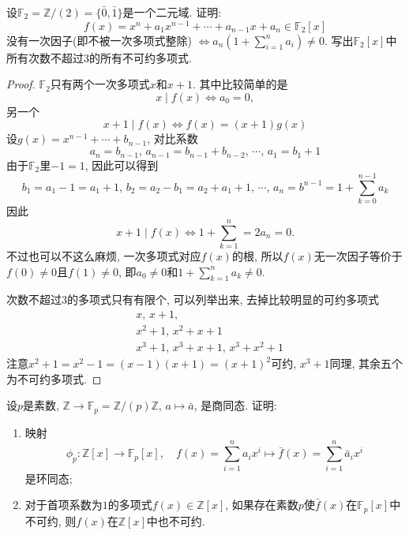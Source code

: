 \begin{problem}
    设$\mathbb{F}_2 = \mathbb{Z}/(2) = \{\bar{0}, \bar{1}\}$是一个二元域. 证明:
    \[
        f(x) = x^n + a_1x^{n - 1} + \cdots + a_{n - 1}x + a_n \in \mathbb{F}_2[x]
    \]
    没有一次因子(即不被一次多项式整除)
    \(
        \Leftrightarrow a_n\left(1 + \sum_{i = 1}^n a_i\right) \neq 0.
    \)
    写出$\mathbb{F}_2[x]$中所有次数不超过$3$的所有不可约多项式.
\end{problem}

\begin{proof}
    $\mathbb{F}_2$只有两个一次多项式$x$和$x + 1$. 其中比较简单的是
    \[
        x \mid f(x) \iff a_0 = 0,
    \]
    另一个
    \[
        x + 1 \mid f(x) \iff f(x) = (x + 1)g(x)
    \]
    设$g(x) = x^{n - 1} + \cdots + b_{n - 1}$, 对比系数
    \[
        a_n = b_{n - 1},\, a_{n - 1} = b_{n - 1} + b_{n - 2},\, \cdots,\, a_{1} = b_1 + 1
    \]
    由于$\mathbb{F}_2$里$-1 = 1$, 因此可以得到
    \[
        b_1 = a_1 - 1 = a_1 + 1,\, b_2 = a_2 - b_1 = a_2 + a_1 + 1,\, \cdots,\, a_n = b^{n - 1} = 1 + \sum_{k = 0}^{n - 1} a_k
    \]
    因此
    \[
        x + 1 \mid f(x) \iff 1 + \sum_{k = 1}^{n} = 2a_n = 0.
    \]
    不过也可以不这么麻烦, 一次多项式对应$f(x)$的根, 所以$f(x)$无一次因子等价于$f(0) \neq 0$且$f(1) \neq 0$, 即$a_0 \neq 0$和$1 + \sum_{k = 1}^{n} a_k \neq 0$.

    次数不超过$3$的多项式只有有限个, 可以列举出来, 去掉比较明显的可约多项式
    \[
    \begin{aligned}
        &x,\, x + 1,\\
        &x^2 + 1,\, x^2 + x + 1\\
        &x^3 + 1,\, x^3 + x + 1,\, x^3 + x^2 + 1
    \end{aligned}
    \]
    注意$x^2 + 1 = x^2 - 1 = (x - 1)(x + 1) = (x + 1)^2$可约, $x^3 + 1$同理, 其余五个为不可约多项式.
\end{proof}

\begin{problem}
    设$p$是素数, $\mathbb{Z} \to \mathbb{F}_p = \mathbb{Z}/(p)\mathbb{Z},\, a \mapsto \bar{a}$, 是商同态. 证明:
    \begin{enumerate}[(1)]
        \item 映射
        \[
            \phi_p:\mathbb{Z}[x] \to \mathbb{F}_p[x],\quad f(x) = \sum_{i = 1}^n a_ix^i \mapsto \bar{f}(x) = \sum_{i = 1}^n \bar{a}_ix^i
        \]
        是环同态;
        \item 对于首项系数为$1$的多项式$f(x) \in \mathbb{Z}[x]$, 如果存在素数$p$使$\bar{f}(x)$在$\mathbb{F}_p[x]$中不可约, 则$f(x)$在$\mathbb{Z}[x]$中也不可约.
    \end{enumerate}
\end{problem}


